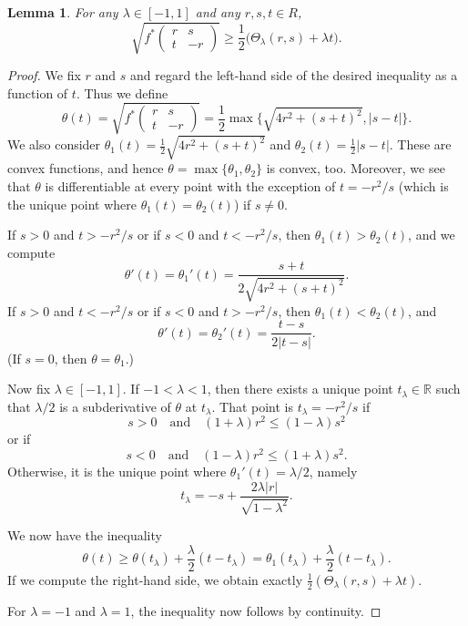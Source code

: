 \documentclass[a4paper]{article}
\newcommand{\R}{\mathbb{R}}
\newtheorem{lemma}[theorem]{Lemma}
\theoremstyle{definition}
\theoremstyle{remark}
\begin{document}
\begin{lemma} \label{lem:f^*-estimate}
For any $\lambda \in [- 1, 1]$ and any $r, s, t \in R$,
\[
\sqrt{f^*\begin{pmatrix} r & s \\ t & - r \end{pmatrix}} \ge \frac{1}{2} \bigl(\Theta_\lambda(r, s) + \lambda t\bigr).
\]
\end{lemma}

\begin{proof}
We fix $r$ and $s$ and regard the left-hand side of the desired inequality
as a function of $t$. Thus we define
\[
\theta(t) = \sqrt{f^*\begin{pmatrix} r & s \\ t & - r \end{pmatrix}} = \frac{1}{2} \max\{\sqrt{4r^2 + (s + t)^2}, |s - t|\}.
\]
We also consider $\theta_1(t) = \frac{1}{2} \sqrt{4r^2 + (s + t)^2}$ and
$\theta_2(t) = \frac{1}{2} |s - t|$. These are convex functions, and hence
$\theta = \max\{\theta_1, \theta_2\}$ is convex, too. Moreover, we see that
$\theta$ is differentiable at every point with the exception of $t = -r^2/s$
(which is the unique point where $\theta_1(t) = \theta_2(t)$) if $s \neq 0$.

If $s > 0$ and $t > -r^2/s$ or if $s < 0$ and $t < -r^2/s$, then
$\theta_1(t) > \theta_2(t)$, and we compute
\[
\theta'(t) = \theta_1'(t) = \frac{s + t}{2\sqrt{4r^2 + (s + t)^2}}.
\]
If $s > 0$ and $t < -r^2/s$ or if $s < 0$ and $t > -r^2/s$, then
$\theta_1(t) < \theta_2(t)$, and
\[
\theta'(t) = \theta_2'(t) = \frac{t - s}{2|t - s|}.
\]
(If $s = 0$, then $\theta = \theta_1$.)

Now fix $\lambda \in [-1, 1]$. If $-1 < \lambda < 1$, then there exists
a unique point $t_\lambda \in \R$ such that $\lambda/2$ is a subderivative
of $\theta$ at $t_\lambda$. That point is $t_\lambda = -r^2/s$ if
\[
s > 0 \quad \text{and} \quad (1 + \lambda)r^2 \le (1 - \lambda) s^2
\]
or if
\[
s < 0 \quad \text{and} \quad (1 - \lambda) r^2 \le (1 + \lambda) s^2.
\]
Otherwise, it is the unique point where $\theta_1'(t) = \lambda/2$, namely
\[
t_\lambda = - s + \frac{2\lambda |r|}{\sqrt{1 - \lambda^2}}.
\]

We now have the inequality
\[
\theta(t) \ge \theta(t_\lambda) + \frac{\lambda}{2}(t - t_\lambda) = \theta_1(t_\lambda) + \frac{\lambda}{2}(t - t_\lambda).
\]
If we compute the right-hand side, we obtain exactly $\frac{1}{2}(\Theta_\lambda(r, s) + \lambda t)$.

For $\lambda = -1$ and $\lambda = 1$, the inequality now follows by continuity.
\end{proof}
\end{document}

